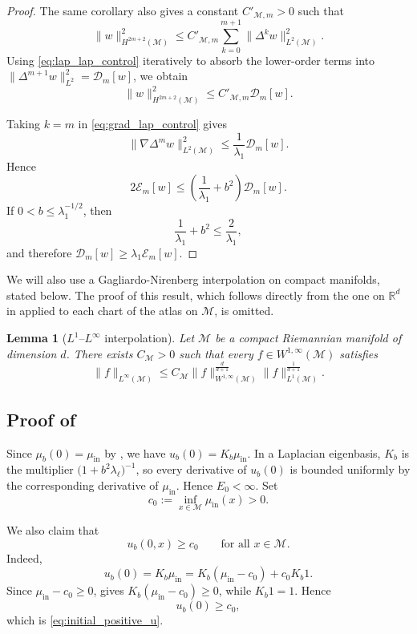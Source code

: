 \documentclass[11pt]{article}
\newtheorem{lemma}[theorem]{Lemma}
\theoremstyle{definition}
\def\M{\mathcal M}
\begin{document}
\begin{proof}
The same corollary also gives a constant $C'_{ \M,m}>0$ such that
\[
\|w\|_{H^{2m+2}( \M)}^2
\le
C'_{ \M,m}\sum_{k=0}^{m+1}\|\Delta^k w\|_{L^2( \M)}^2.
\]
Using \eqref{eq:lap_lap_control} iteratively to absorb the lower-order terms into $\|\Delta^{m+1}w\|_{L^2}^2 = \mathcal D_m[w]$, we obtain
\[
\|w\|_{H^{2m+2}( \M)}^2
\le
C'_{ \M,m}\mathcal D_m[w].
\]

Taking $k=m$ in \eqref{eq:grad_lap_control} gives
\[
\|\nabla \Delta^m w\|_{L^2( \M)}^2
\le
\frac{1}{ \lambda_1}\mathcal D_m[w].
\]
Hence
\[
2\mathcal E_m[w]
\le
\left(\frac{1}{ \lambda_1}+b^2\right)\mathcal D_m[w].
\]
If $0 < b \le \lambda_1^{-1/2}$, then
\[
\frac{1}{ \lambda_1}+b^2\le \frac{2}{ \lambda_1},
\]
and therefore $\mathcal D_m[w] \ge  \lambda_1\mathcal E_m[w]$.
\end{proof}

We will also use a Gagliardo-Nirenberg interpolation on compact manifolds, stated below. The proof of this result, which follows directly from the one on $\mathbb R^d$ in \cite[(86)]{brezis2011functional} applied to each chart of the atlas on $\M$, is omitted. 
\begin{lemma}[$L^1$--$L^\infty$ interpolation]\label{lem:l1_to_linf}
Let $\M$ be a compact Riemannian manifold of dimension $d$. There exists $C_\M>0$ such that every $f\in W^{1,\infty}(\M)$ satisfies
\[
\|f\|_{L^\infty(\M)}
\le
C_\M
\|f\|_{W^{1,\infty}(\M)}^{\frac{d}{d+1}}
\|f\|_{L^1(\M)}^{\frac{1}{d+1}}.
\]
\end{lemma}


\subsection{Proof of }
\label{sec:proofintermediate}

Since $\mu_b(0)=\mu_{\mathrm{in}}$ by , we have $u_b(0)=K_b\mu_{\mathrm{in}}$. In  a Laplacian eigenbasis, $K_b$ is the multiplier $\bigl(1+b^2\lambda_\ell\bigr)^{-1}$, so every derivative of $u_b(0)$ is bounded uniformly by the corresponding derivative of $\mu_{\mathrm{in}}$. Hence $E_0 < \infty$. Set
\[
c_0 := \inf_{x\in  \M}\mu_{\mathrm{in}}(x) > 0.
\]

We also claim that
\begin{equation}\label{eq:initial_positive_u}
u_b(0,x)\ge c_0
\qquad\text{for all }x\in  \M.
\end{equation}
Indeed,
\[
u_b(0)=K_b\mu_{\mathrm{in}}=K_b(\mu_{\mathrm{in}}-c_0)+c_0 K_b1.
\]
Since $\mu_{\mathrm{in}}-c_0\ge0$,  gives
$K_b(\mu_{\mathrm{in}}-c_0)\ge0$, while $K_b1=1$. Hence
\[
u_b(0)\ge c_0,
\]
which is \eqref{eq:initial_positive_u}.
\end{document}
